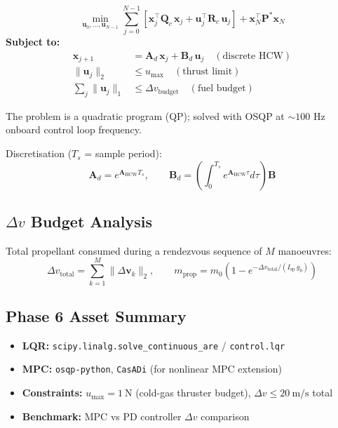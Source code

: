 \documentclass[12pt, a4paper]{article}
\newcommand{\vx}{\mathbf{x}}
\newcommand{\vcu}{\mathbf{u}}
\newcommand{\mA}{\mathbf{A}}
\newcommand{\mB}{\mathbf{B}}
\newcommand{\HCW}{\mathrm{HCW}}
\newcommand{\Deltav}{\Delta v}
\newcommand{\Isp}{I_{\mathrm{sp}}}
\begin{document}
\begin{formulabox}[title=MPC Optimisation Problem]
\begin{equation}
\min_{\vcu_0, \ldots, \vcu_{N-1}}
\sum_{j=0}^{N-1}\!\left[\vx_j^\top \mathbf{Q}_c\, \vx_j
+ \vcu_j^\top \mathbf{R}_c\, \vcu_j\right]
+ \vx_N^\top \mathbf{P}^* \vx_N
\end{equation}
\textbf{Subject to:}
\begin{align}
\vx_{j+1}     &= \mA_d\, \vx_j + \mB_d\, \vcu_j \quad (\text{discrete HCW}) \\
\|\vcu_j\|_2   &\leq u_{\max}                       \quad (\text{thrust limit}) \\
\sum_j \|\vcu_j\|_1 &\leq \Deltav_{\mathrm{budget}}     \quad (\text{fuel budget})
\end{align}
\end{formulabox}

The problem is a quadratic program (QP); solved with OSQP at $\sim 100$
Hz onboard control loop frequency.

Discretisation ($T_s$ = sample period):
\begin{equation}
\mA_d = e^{\mA_{\HCW} T_s}, \qquad
\mB_d = \left(\int_0^{T_s} e^{\mA_{\HCW}\tau} d\tau\right) \mB
\end{equation}

\subsection{$\Delta v$ Budget Analysis}

Total propellant consumed during a rendezvous sequence of $M$ manoeuvres:
\begin{equation}
\Deltav_{\mathrm{total}} = \sum_{k=1}^{M} \|\Delta\mathbf{v}_k\|_2, \qquad
m_{\mathrm{prop}} = m_0\!\left(1 - e^{-\Deltav_{\mathrm{total}}/(\Isp\, g_0)}\right)
\end{equation}

\subsection{Phase 6 Asset Summary}
\begin{assetbox}[title=Phase 6 Assets]
\begin{itemize}[leftmargin=1.5em, itemsep=2pt]
    \item \textbf{LQR:} \texttt{scipy.linalg.solve\_continuous\_are} /
          \texttt{control.lqr}
    \item \textbf{MPC:} \texttt{osqp-python}, \texttt{CasADi} (for nonlinear MPC extension)
    \item \textbf{Constraints:} $u_{\max} = 1\ \mathrm{N}$ (cold-gas thruster budget),
          $\Deltav \leq 20\ \mathrm{m/s}$ total
    \item \textbf{Benchmark:} MPC vs PD controller $\Deltav$ comparison
\end{itemize}
\end{assetbox}
\end{document}

